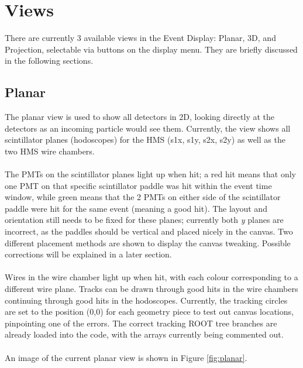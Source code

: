 \documentclass[12pt]{article}
\numberwithin{equation}{section}
\begin{document}
\section{Views}
There are currently 3 available views in the Event Display: Planar, 3D, and Projection, selectable via buttons on the display menu. They are briefly discussed in the following sections.

\subsection{Planar}
The planar view is used to show all detectors in 2D, looking directly at the detectors as an incoming particle would see them. Currently, the view shows all scintillator planes (hodoscopes) for the HMS (s1x, s1y, s2x, s2y) as well as the two HMS wire chambers. 
\\
\\
The PMTs on the scintillator planes light up when hit; a red hit means that only one PMT on that specific scintillator paddle was hit within the event time window, while green means that the 2 PMTs on either side of the scintillator paddle were hit for the same event (meaning a good hit). The layout and orientation still needs to be fixed for these planes; currently both \textit{y} planes are incorrect, as the paddles should be vertical and placed nicely in the canvas. Two different placement methods are shown to display the canvas tweaking. Possible corrections will be explained in a later section.
\\
\\
Wires in the wire chamber light up when hit, with each colour corresponding to a different wire plane. Tracks can be drawn through good hits in the wire chambers continuing through good hits in the hodoscopes. Currently, the tracking circles are set to the position (0,0) for each geometry piece to test out canvas locations, pinpointing one of the errors. The correct tracking ROOT tree branches are already loaded into the code, with the arrays currently being commented out.  
\\
\\
An image of the current planar view is shown in Figure \ref{fig:planar}.
\end{document}
